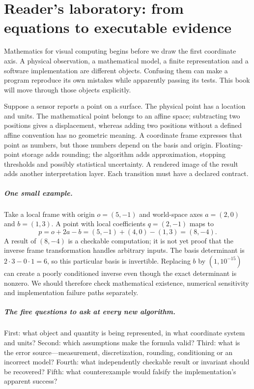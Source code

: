 \chapter*{Reader's laboratory: from equations to executable evidence}
\noindent Mathematics for visual computing begins before we draw the first
coordinate axis. A physical observation, a mathematical model, a finite
representation and a software implementation are different objects.
Confusing them can make a program reproduce its own mistakes while apparently
passing its tests. This book will move through those objects explicitly.

Suppose a sensor reports a point on a surface. The physical point has a
location and units. The mathematical point belongs to an affine space;
subtracting two positions gives a displacement, whereas adding two positions
without a defined affine convention has no geometric meaning. A coordinate
frame expresses that point as numbers, but those numbers depend on the basis
and origin. Floating-point storage adds rounding; the algorithm adds
approximation, stopping thresholds and possibly statistical uncertainty.
A rendered image of the result adds another interpretation layer. Each
transition must have a declared contract.

\paragraph{One small example.}
Take a local frame with origin \(o=(5,-1)\) and world-space axes
\(a=(2,0)\) and \(b=(1,3)\). A point with local coefficients
\(q=(2,-1)\) maps to
\[
p=o+2a-b=(5,-1)+(4,0)-(1,3)=(8,-4).
\]
A result of \((8,-4)\) is a checkable computation; it is not yet proof
that the inverse frame transformation handles arbitrary inputs. The
basis determinant is \(2\cdot3-0\cdot1=6\), so this particular
basis is invertible. Replacing \(b\) by \((1,10^{-15})\) can create a
poorly conditioned inverse even though the exact determinant is nonzero.
We should therefore check mathematical existence, numerical sensitivity
and implementation failure paths separately.

\paragraph{The five questions to ask at every new algorithm.}
First: what object and quantity is being represented, in what coordinate
system and units? Second: which assumptions make the formula valid?
Third: what is the error source---measurement, discretization, rounding,
conditioning or an incorrect model? Fourth: what independently checkable
result or invariant should be recovered? Fifth: what counterexample would
falsify the implementation's apparent success?

